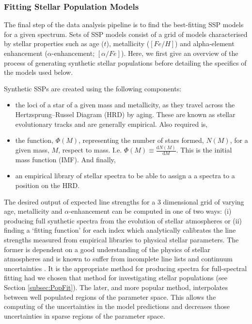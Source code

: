 		\subsubsection{Fitting Stellar Population Models}
			\label{subsubsec:StellarPop}
			The final step of the data analysis pipeline is to find the best-fitting SSP models for a given spectrum. Sets of SSP models consist of a grid of models characterised by stellar properties such as age ($t$), metallicity ($[Fe/H]$) and alpha-element enhancement ($\alpha$-enhancement; $[\alpha/Fe]$). Here, we first give an overview of the process of generating synthetic stellar populations before detailing the specifics of the models used below. 

			Synthetic SSPs are created using the following components:
			\begin{itemize}
				\item the loci of a star of a given mass and metallicity, as they travel across the Hertzsprung--Russel Diagram (HRD) by aging. These are known as stellar evolutionary tracks and are generally empirical. Also required is,
				\item the function, $\Phi(M)$, representing the number of stars formed, $N(M)$, for a given mass, $M$, respect to mass. I.e. $\Phi(M) \equiv \frac{\mathrm{d}N(M)}{\mathrm{d}M}$. This is the initial mass function (IMF). And finally,
				\item an empirical library of stellar spectra to be able to assign a a spectra to a position on the HRD. 
			\end{itemize}
			The desired output of expected line strengths for a 3 dimensional grid of varying age, metallicity and $\alpha$-enhancement can be computed in one of two ways: (i) producing full synthetic spectra from the evolution of stellar atmospheres or (ii) finding a `fitting function' for each index which analytically calibrates the line strengths measured from empirical libraries to physical stellar parameters. The former is dependent on a good understanding of the physics of stellar atmospheres and is known to suffer from incomplete line lists and continuum uncertainties \citep{Thomas2004}. It is the appropriate method for producing spectra for full-spectral fitting had we chosen that method for investigating stellar populations (see Section \ref{subsec:PopFit}). The later, and more popular method, interpolates between well populated regions of the parameter space. This allows the computing of the uncertainties in the model predictions and decreases those uncertainties in sparse regions of the parameter space. 

